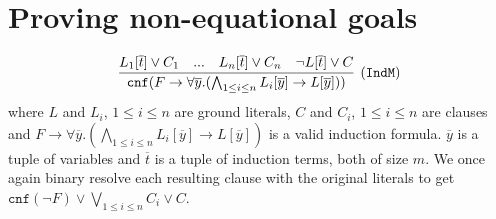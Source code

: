 
\section{Proving non-equational goals}
\begin{equation*}\label{eq:multind}
\infer[\small{\tt (IndM)}]{\mathtt{cnf}(F \rightarrow \forall \overline{y}.(\bigwedge_{1\le i\le n}L_i[\overline{y}]\rightarrow L[\overline{y}]))}{L_1[\overline{t}]\lor C_1\quad...\quad L_n[\overline{t}]\lor C_n\quad\lnot L[\overline{t}] \lor C}
\end{equation*}
where $L$ and $L_i$, $1\le i\le n$ are ground literals, $C$ and $C_i$, $1\le i\le n$ are clauses and $F \rightarrow \forall \overline{y}.(\bigwedge_{1\le i\le n}L_i[\overline{y}]\rightarrow L[\overline{y}])$ is a valid induction formula. $\overline{y}$ is a tuple of variables and $\overline{t}$ is a tuple of induction terms, both of size $m$. We once again binary resolve each resulting clause with the original literals to get $\mathtt{cnf}(\lnot F) \lor\bigvee_{1\le i\le n} C_i\lor C$.
